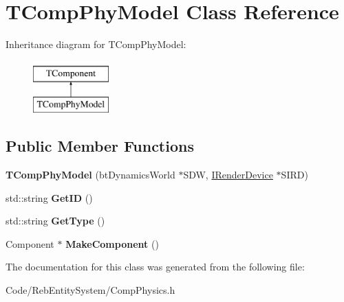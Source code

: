 \hypertarget{class_t_comp_phy_model}{}\section{T\+Comp\+Phy\+Model Class Reference}
\label{class_t_comp_phy_model}
Inheritance diagram for T\+Comp\+Phy\+Model\+:\begin{figure}[H]
\begin{center}
\leavevmode
\includegraphics[height=2.000000cm]{class_t_comp_phy_model}
\end{center}
\end{figure}
\subsection*{Public Member Functions}
\begin{DoxyCompactItemize}
\item 
{\bfseries T\+Comp\+Phy\+Model} (bt\+Dynamics\+World $\ast$S\+DW, \hyperlink{class_i_render_device}{I\+Render\+Device} $\ast$S\+I\+RD)\hypertarget{class_t_comp_phy_model_af53a74f9e59b775735f7297501598b33}{}\label{class_t_comp_phy_model_af53a74f9e59b775735f7297501598b33}

\item 
std\+::string {\bfseries Get\+ID} ()\hypertarget{class_t_comp_phy_model_ab5a07027b0580a54103e12ceddb40ec0}{}\label{class_t_comp_phy_model_ab5a07027b0580a54103e12ceddb40ec0}

\item 
std\+::string {\bfseries Get\+Type} ()\hypertarget{class_t_comp_phy_model_a5e371ef8ded045e2f6ba4392b4078feb}{}\label{class_t_comp_phy_model_a5e371ef8ded045e2f6ba4392b4078feb}

\item 
Component $\ast$ {\bfseries Make\+Component} ()\hypertarget{class_t_comp_phy_model_a35e289e1a72d8b5abea830472a63e8ef}{}\label{class_t_comp_phy_model_a35e289e1a72d8b5abea830472a63e8ef}

\end{DoxyCompactItemize}


The documentation for this class was generated from the following file\+:\begin{DoxyCompactItemize}
\item 
Code/\+Reb\+Entity\+System/Comp\+Physics.\+h\end{DoxyCompactItemize}
